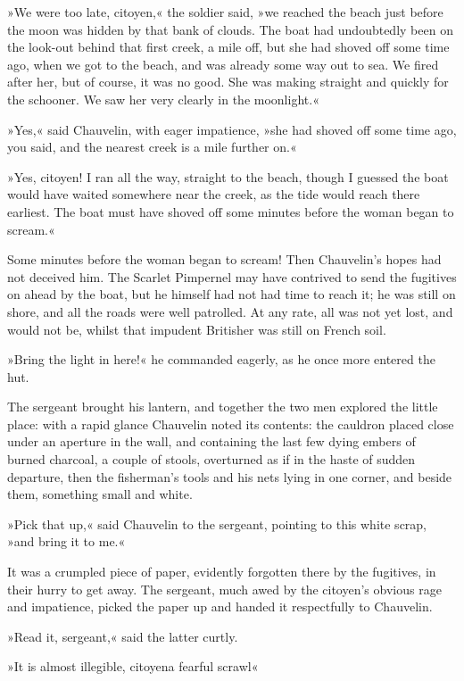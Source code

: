 »We were too late, citoyen,« the soldier said, »we reached the beach just before the moon was hidden by that bank of clouds. The boat had undoubtedly been on the look-out behind that first creek, a mile off, but she had shoved off some time ago, when we got to the beach, and was already some way out to sea. We fired after her, but of course, it was no good. She was making straight and quickly for the schooner. We saw her very clearly in the moonlight.«

»Yes,« said Chauvelin, with eager impatience, »she had shoved off some time ago, you said, and the nearest creek is a mile further on.«

»Yes, citoyen! I ran all the way, straight to the beach, though I guessed the boat would have waited somewhere near the creek, as the tide would reach there earliest. The boat must have shoved off some minutes before the woman began to scream.«

Some minutes before the woman began to scream! Then Chauvelin's hopes had not deceived him. The Scarlet Pimpernel may have contrived to send the fugitives on ahead by the boat, but he himself had not had time to reach it; he was still on shore, and all the roads were well patrolled. At any rate, all was not yet lost, and would not be, whilst that impudent Britisher was still on French soil.

»Bring the light in here!« he commanded eagerly, as he once more entered the hut.

The sergeant brought his lantern, and together the two men explored the little place: with a rapid glance Chauvelin noted its contents: the cauldron placed close under an aperture in the wall, and containing the last few dying embers of burned charcoal, a couple of stools, overturned as if in the haste of sudden departure, then the fisherman's tools and his nets lying in one corner, and beside them, something small and white.

»Pick that up,« said Chauvelin to the sergeant, pointing to this white scrap, »and bring it to me.«

It was a crumpled piece of paper, evidently forgotten there by the fugitives, in their hurry to get away. The sergeant, much awed by the citoyen's obvious rage and impatience, picked the paper up and handed it respectfully to Chauvelin.

»Read it, sergeant,« said the latter curtly.

»It is almost illegible, citoyen\textellipsis \allowbreak  a fearful scrawl\textellipsis«

